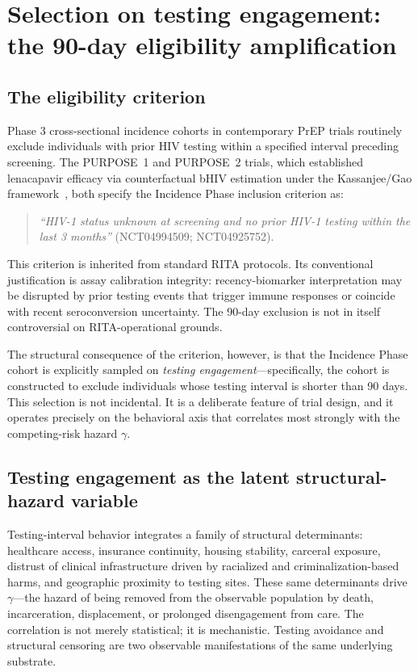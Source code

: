 \documentclass[11pt]{article}
\begin{document}
\section{Selection on testing engagement: the 90-day eligibility amplification}

\subsection{The eligibility criterion}

Phase 3 cross-sectional incidence cohorts in contemporary PrEP trials routinely exclude individuals with prior HIV testing within a specified interval preceding screening. The PURPOSE~1 and PURPOSE~2 trials, which established lenacapavir efficacy via counterfactual bHIV estimation under the Kassanjee/Gao framework~\cite{bekker2024,kelley2025}, both specify the Incidence Phase inclusion criterion as:
\begin{quote}
\textit{``HIV-1 status unknown at screening and no prior HIV-1 testing within the last 3 months''} (NCT04994509; NCT04925752).
\end{quote}
This criterion is inherited from standard RITA protocols. Its conventional justification is assay calibration integrity: recency-biomarker interpretation may be disrupted by prior testing events that trigger immune responses or coincide with recent seroconversion uncertainty. The 90-day exclusion is not in itself controversial on RITA-operational grounds.

The structural consequence of the criterion, however, is that the Incidence Phase cohort is explicitly sampled on \emph{testing engagement}---specifically, the cohort is constructed to exclude individuals whose testing interval is shorter than 90 days. This selection is not incidental. It is a deliberate feature of trial design, and it operates precisely on the behavioral axis that correlates most strongly with the competing-risk hazard $\gamma$.

\subsection{Testing engagement as the latent structural-hazard variable}

Testing-interval behavior integrates a family of structural determinants: healthcare access, insurance continuity, housing stability, carceral exposure, distrust of clinical infrastructure driven by racialized and criminalization-based harms, and geographic proximity to testing sites. These same determinants drive $\gamma$---the hazard of being removed from the observable population by death, incarceration, displacement, or prolonged disengagement from care. The correlation is not merely statistical; it is mechanistic. Testing avoidance and structural censoring are two observable manifestations of the same underlying substrate.
\end{document}
